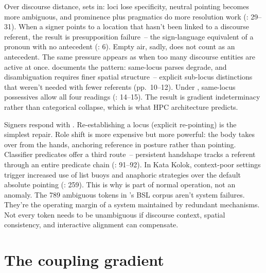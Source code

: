 Over discourse distance,  sets in: loci lose specificity, neutral pointing becomes more ambiguous, and prominence plus pragmatics do more resolution work (\citealt{steinbach2016}: 29--31). When a signer points to a location that hasn't been linked to a discourse referent, the result is presupposition failure~-- the sign-language equivalent of a pronoun with no antecedent (\citealt{steinbach2016}: 6). Empty air, sadly, does not count as an antecedent. The same pressure appears as  when too many discourse entities are active at once. \textcite{schlenker2017} documents the pattern: same-locus parses degrade, and disambiguation requires finer spatial structure~-- explicit sub-locus distinctions that weren't needed with fewer referents (pp.~10--12). Under , same-locus possessives allow all four readings (\citealt{kuhn2016}: 14--15). The result is gradient indeterminacy rather than categorical collapse, which is what HPC architecture predicts.

Signers respond with . Re-establishing a locus (explicit re-pointing) is the simplest repair. Role shift is more expensive but more powerful: the body takes over from the hands, anchoring reference in posture rather than pointing. Classifier predicates offer a third route~-- persistent handshape tracks a referent through an entire predicate chain (\citealt{sandler2006}: 91--92). In Kata Kolok, context-poor settings trigger increased use of list buoys and anaphoric strategies over the default absolute pointing (\citealt{devos2012}: 259). This is why  is part of normal operation, not an anomaly. The 789 ambiguous tokens in \citeauthor{cormier2013}'s BSL corpus aren't system failures. They're the operating margin of a system maintained by redundant mechanisms. Not every token needs to be unambiguous if discourse context, spatial consistency, and interactive alignment can compensate.


\section{The coupling gradient}
\label{sec:sign:gradient}

